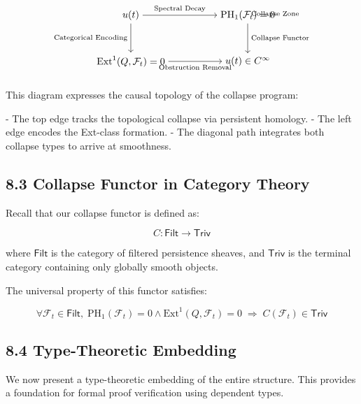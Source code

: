 \documentclass[11pt]{article}
\begin{document}
\[
\begin{tikzpicture}[every node/.style={anchor=center}]
  \matrix (m) [matrix of math nodes, row sep=3em, column sep=5em] {
    u(t) & {\mathrm{PH}_1(\mathcal{F}_t) = 0} \\
    {\mathrm{Ext}^1(Q, \mathcal{F}_t) = 0} & u(t) \in C^\infty \\
  };

  \path[->]
    (m-1-1) edge node[above]{\scriptsize Spectral Decay} (m-1-2)
    (m-1-1) edge node[left]{\scriptsize Categorical Encoding} (m-2-1)
    (m-1-2) edge node[right]{\scriptsize Collapse Functor} (m-2-2)
    (m-2-1) edge node[below]{\scriptsize Obstruction Removal} (m-2-2);

  \path[->, bend left=50] (m-1-2.north east) to node[above right]{\scriptsize Collapse Zone} (m-1-2.north west);
\end{tikzpicture}
\]

This diagram expresses the causal topology of the collapse program:

- The top edge tracks the topological collapse via persistent homology.
- The left edge encodes the Ext-class formation.
- The diagonal path integrates both collapse types to arrive at smoothness.

\subsection{8.3 Collapse Functor in Category Theory}

Recall that our collapse functor is defined as:

\[
C: \mathsf{Filt} \longrightarrow \mathsf{Triv}
\]

where \( \mathsf{Filt} \) is the category of filtered persistence sheaves,  
and \( \mathsf{Triv} \) is the terminal category containing only globally smooth objects.

The universal property of this functor satisfies:

\[
\forall \mathcal{F}_t \in \mathsf{Filt},\;
\mathrm{PH}_1(\mathcal{F}_t) = 0 \land \mathrm{Ext}^1(Q, \mathcal{F}_t) = 0
\;\Rightarrow\;
C(\mathcal{F}_t) \in \mathsf{Triv}
\]

\subsection{8.4 Type-Theoretic Embedding}

We now present a type-theoretic embedding of the entire structure.  
This provides a foundation for formal proof verification using dependent types.
\end{document}
